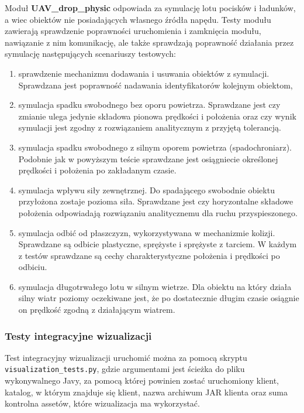 Moduł \textbf{UAV\_drop\_physic} odpowiada za symulację lotu pocisków i ładunków, a wiec obiektów nie posiadających własnego źródła napędu. Testy modułu zawierają sprawdzenie poprawności uruchomienia i zamknięcia modułu, nawiązanie z nim komunikację, ale także sprawdzają poprawność działania przez symulację następujących scenariuszy testowych:

\begin{enumerate}
\item sprawdzenie mechanizmu dodawania i usuwania obiektów z symulacji. Sprawdzana jest poprawność nadawania identyfikatorów kolejnym obiektom,
\item symulacja spadku swobodnego bez oporu powietrza. Sprawdzane jest czy zmianie ulega jedynie składowa pionowa prędkości i położenia oraz czy wynik symulacji jest zgodny z rozwiązaniem analitycznym z przyjętą tolerancją.
\item symulacja spadku swobodnego z silnym oporem powietrza (spadochroniarz). Podobnie jak w powyższym teście sprawdzane jest osiągniecie określonej prędkości i położenia po zakładanym czasie.
\item symulacja wpływu siły zewnętrznej. Do spadającego swobodnie obiektu przyłożona zostaje pozioma siła. Sprawdzane jest czy horyzontalne składowe położenia odpowiadają rozwiązaniu analitycznemu dla ruchu przyspieszonego.
\item symulacja odbić od płaszczyzn, wykorzystywana w mechanizmie kolizji. Sprawdzane są odbicie plastyczne, sprężyste i sprężyste z tarciem. W każdym z testów sprawdzane są cechy charakterystyczne położenia i prędkości po odbiciu.
\item symulacja długotrwałego lotu w silnym wietrze. Dla obiektu na który działa silny wiatr poziomy oczekiwane jest, że po dostatecznie długim czasie osiągnie on prędkość zgodną z działającym wiatrem. 
\end{enumerate}
\subsubsection{Testy integracyjne wizualizacji}

Test integracyjny wizualizacji uruchomić można za pomocą skryptu \\ \texttt{visualization\_tests.py}, gdzie argumentami jest ścieżka do pliku wykonywalnego Javy, za pomocą której powinien zostać uruchomiony klient, katalog, w którym znajduje się klient, nazwa archiwum JAR klienta oraz suma kontrolna assetów, które wizualizacja ma wykorzystać. \\


